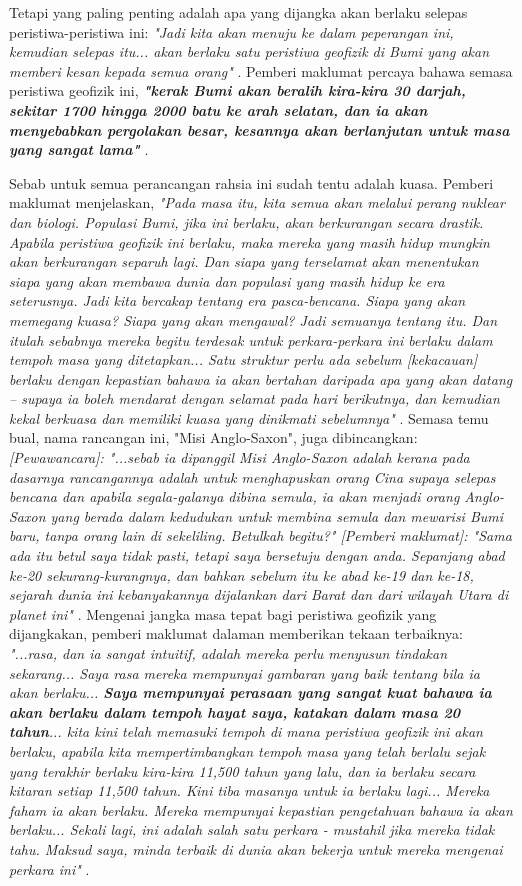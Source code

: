 \documentclass[10pt,twocolumn,letterpaper]{article}
\begin{document}
Tetapi yang paling penting adalah apa yang dijangka akan berlaku selepas peristiwa-peristiwa ini: \textit{"Jadi kita akan menuju ke dalam peperangan ini, kemudian selepas itu... akan berlaku satu peristiwa geofizik di Bumi yang akan memberi kesan kepada semua orang"} \cite{4}. Pemberi maklumat percaya bahawa semasa peristiwa geofizik ini, \textit{\textbf{"kerak Bumi akan beralih kira-kira 30 darjah, sekitar 1700 hingga 2000 batu ke arah selatan, dan ia akan menyebabkan pergolakan besar, kesannya akan berlanjutan untuk masa yang sangat lama"}} \cite{4}.

Sebab untuk semua perancangan rahsia ini sudah tentu adalah kuasa. Pemberi maklumat menjelaskan, \textit{"Pada masa itu, kita semua akan melalui perang nuklear dan biologi. Populasi Bumi, jika ini berlaku, akan berkurangan secara drastik. Apabila peristiwa geofizik ini berlaku, maka mereka yang masih hidup mungkin akan berkurangan separuh lagi. Dan siapa yang terselamat akan menentukan siapa yang akan membawa dunia dan populasi yang masih hidup ke era seterusnya. Jadi kita bercakap tentang era pasca-bencana. Siapa yang akan memegang kuasa? Siapa yang akan mengawal? Jadi semuanya tentang itu. Dan itulah sebabnya mereka begitu terdesak untuk perkara-perkara ini berlaku dalam tempoh masa yang ditetapkan... Satu struktur perlu ada sebelum [kekacauan] berlaku dengan kepastian bahawa ia akan bertahan daripada apa yang akan datang -- supaya ia boleh mendarat dengan selamat pada hari berikutnya, dan kemudian kekal berkuasa dan memiliki kuasa yang dinikmati sebelumnya"} \cite{4}. Semasa temu bual, nama rancangan ini, "Misi Anglo-Saxon", juga dibincangkan: \textit{[Pewawancara]: "...sebab ia dipanggil Misi Anglo-Saxon adalah kerana pada dasarnya rancangannya adalah untuk menghapuskan orang Cina supaya selepas bencana dan apabila segala-galanya dibina semula, ia akan menjadi orang Anglo-Saxon yang berada dalam kedudukan untuk membina semula dan mewarisi Bumi baru, tanpa orang lain di sekeliling. Betulkah begitu?" [Pemberi maklumat]: "Sama ada itu betul saya tidak pasti, tetapi saya bersetuju dengan anda. Sepanjang abad ke-20 sekurang-kurangnya, dan bahkan sebelum itu ke abad ke-19 dan ke-18, sejarah dunia ini kebanyakannya dijalankan dari Barat dan dari wilayah Utara di planet ini"} \cite{4}.
Mengenai jangka masa tepat bagi peristiwa geofizik yang dijangkakan, pemberi maklumat dalaman memberikan tekaan terbaiknya: \textit{"...rasa, dan ia sangat intuitif, adalah mereka perlu menyusun tindakan sekarang... Saya rasa mereka mempunyai gambaran yang baik tentang bila ia akan berlaku... \textbf{Saya mempunyai perasaan yang sangat kuat bahawa ia akan berlaku dalam tempoh hayat saya, katakan dalam masa 20 tahun}... kita kini telah memasuki tempoh di mana peristiwa geofizik ini akan berlaku, apabila kita mempertimbangkan tempoh masa yang telah berlalu sejak yang terakhir berlaku kira-kira 11,500 tahun yang lalu, dan ia berlaku secara kitaran setiap 11,500 tahun. Kini tiba masanya untuk ia berlaku lagi... Mereka faham ia akan berlaku. Mereka mempunyai kepastian pengetahuan bahawa ia akan berlaku... Sekali lagi, ini adalah salah satu perkara - mustahil jika mereka tidak tahu. Maksud saya, minda terbaik di dunia akan bekerja untuk mereka mengenai perkara ini"} \cite{4}.
\end{document}

